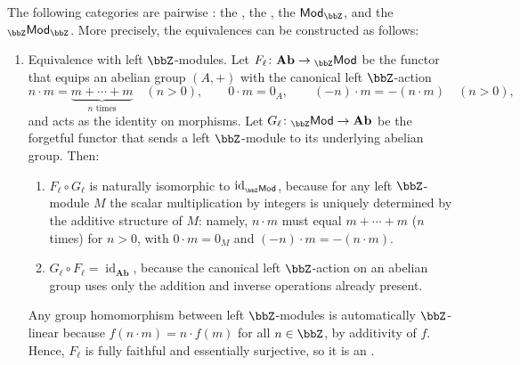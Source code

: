 \begin{proposition} \label{proposition:category_of_abelian_groups_is_equivalent_to_categories_of_Z_modules}
    The following categories are pairwise :
    the , the , the  $\mathsf{Mod}_\bbZ$, and the  ${}_\bbZ\mathsf{Mod}_\bbZ$. More precisely, the equivalences can be constructed as follows:
    \begin{enumerate}
        \item
        Equivalence with left $\bbZ$-modules.
        Let $F_\ell \colon \mathbf{Ab} \to {}_\bbZ\mathsf{Mod}$ be the functor that equips an abelian group $(A,+)$ with the canonical left $\bbZ$-action
        $$n \cdot m = \underbrace{m + \cdots + m}_{n \text{ times}} \quad (n > 0), \qquad 0 \cdot m = 0_A, \qquad (-n) \cdot m = -(n \cdot m) \quad (n > 0),$$
        and acts as the identity on morphisms. Let $G_\ell \colon {}_\bbZ\mathsf{Mod} \to \mathbf{Ab}$ be the forgetful functor that sends a left $\bbZ$-module to its underlying abelian group. Then:

        \begin{enumerate}
            \item $F_\ell \circ G_\ell$ is naturally isomorphic to $\operatorname{id}_{{}_\bbZ\mathsf{Mod}}$, because for any left $\bbZ$-module $M$ the scalar multiplication by integers is uniquely determined by the additive structure of $M$: namely, $n \cdot m$ must equal $m + \cdots + m$ ($n$ times) for $n > 0$, with $0 \cdot m = 0_M$ and $(-n) \cdot m = -(n \cdot m)$.

            \item $G_\ell \circ F_\ell = \operatorname{id}_{\mathbf{Ab}}$, because the canonical left $\bbZ$-action on an abelian group uses only the addition and inverse operations already present.
        \end{enumerate}

        Any group homomorphism between left $\bbZ$-modules is automatically $\bbZ$-linear because $f(n \cdot m) = n \cdot f(m)$ for all $n \in \bbZ$, by additivity of $f$. Hence, $F_\ell$ is fully faithful and essentially surjective, so it is an .


\end{enumerate}
\end{proposition}
